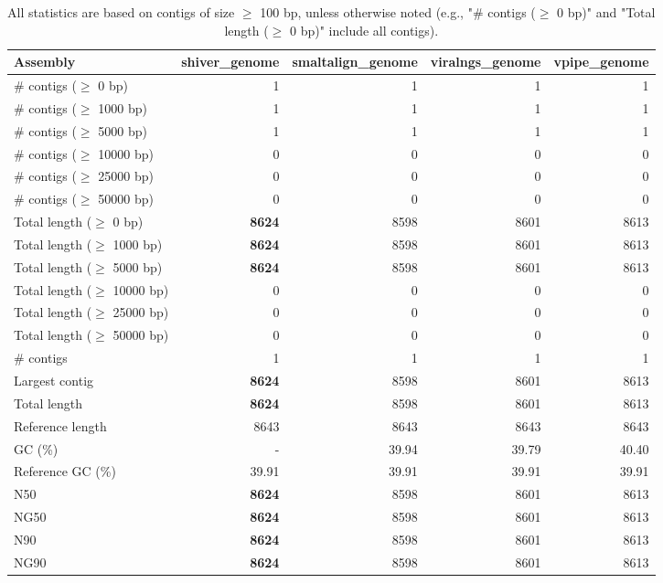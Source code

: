 \documentclass[12pt,a4paper]{article}
\begin{document}
\begin{table}[ht]
\begin{center}
\caption{All statistics are based on contigs of size $\geq$ 100 bp, unless otherwise noted (e.g., "\# contigs ($\geq$ 0 bp)" and "Total length ($\geq$ 0 bp)" include all contigs).}
\begin{tabular}{|l*{4}{|r}|}
\hline
Assembly & shiver\_genome & smaltalign\_genome & viralngs\_genome & vpipe\_genome \\ \hline
\# contigs ($\geq$ 0 bp) & 1 & 1 & 1 & 1 \\ \hline
\# contigs ($\geq$ 1000 bp) & 1 & 1 & 1 & 1 \\ \hline
\# contigs ($\geq$ 5000 bp) & 1 & 1 & 1 & 1 \\ \hline
\# contigs ($\geq$ 10000 bp) & 0 & 0 & 0 & 0 \\ \hline
\# contigs ($\geq$ 25000 bp) & 0 & 0 & 0 & 0 \\ \hline
\# contigs ($\geq$ 50000 bp) & 0 & 0 & 0 & 0 \\ \hline
Total length ($\geq$ 0 bp) & {\bf 8624} & 8598 & 8601 & 8613 \\ \hline
Total length ($\geq$ 1000 bp) & {\bf 8624} & 8598 & 8601 & 8613 \\ \hline
Total length ($\geq$ 5000 bp) & {\bf 8624} & 8598 & 8601 & 8613 \\ \hline
Total length ($\geq$ 10000 bp) & 0 & 0 & 0 & 0 \\ \hline
Total length ($\geq$ 25000 bp) & 0 & 0 & 0 & 0 \\ \hline
Total length ($\geq$ 50000 bp) & 0 & 0 & 0 & 0 \\ \hline
\# contigs & 1 & 1 & 1 & 1 \\ \hline
Largest contig & {\bf 8624} & 8598 & 8601 & 8613 \\ \hline
Total length & {\bf 8624} & 8598 & 8601 & 8613 \\ \hline
Reference length & 8643 & 8643 & 8643 & 8643 \\ \hline
GC (\%) & - & 39.94 & 39.79 & 40.40 \\ \hline
Reference GC (\%) & 39.91 & 39.91 & 39.91 & 39.91 \\ \hline
N50 & {\bf 8624} & 8598 & 8601 & 8613 \\ \hline
NG50 & {\bf 8624} & 8598 & 8601 & 8613 \\ \hline
N90 & {\bf 8624} & 8598 & 8601 & 8613 \\ \hline
NG90 & {\bf 8624} & 8598 & 8601 & 8613 \\ \hline

\end{tabular}
\end{center}
\end{table}
\end{document}
